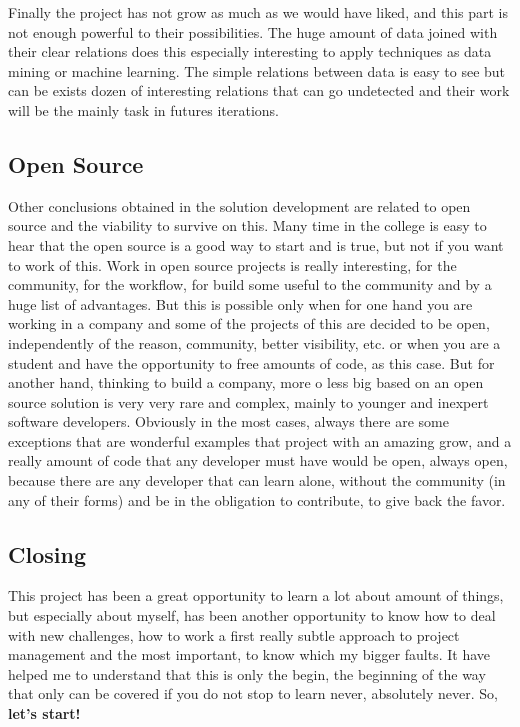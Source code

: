 Finally the project has not grow as much as we would have liked, and this part
is not enough powerful to their possibilities. The huge amount of data joined
with their clear relations does this especially interesting to apply techniques
as data mining or machine learning. The simple relations between data is easy
to see but can be exists dozen of interesting relations that can go undetected
and their work will be the mainly task in futures iterations.

\subsection{Open Source}

Other conclusions obtained in the solution development are related to open source and the
viability to survive on this. Many time in the college is easy to hear that the
open source is a good way to start and is true, but not if you want to work of
this. Work in open source projects is really interesting, for the community,
for the workflow, for build some useful to the community and by a huge list of
advantages. But this is possible only when for one hand you are working in a
company and some of the projects of this are decided to be open, independently of the
reason, community, better visibility, etc. or when you are a student and have
the opportunity to free amounts of code, as this case. But for another hand,
thinking to build a company, more o less big based on an open source solution
is very very rare and complex, mainly to younger and inexpert software developers.
\intro
Obviously in the most cases, always there are some exceptions that are
wonderful examples that project with an amazing grow, and a really amount of
code that any developer must have would be open, always open, because there
are any developer that can learn alone, without the community (in any of their
forms) and be in the obligation to contribute, to give back the favor.

\subsection{Closing}
This project has been a great opportunity to learn a lot about amount of things,
but especially about myself, has been another opportunity to know how to deal with
new challenges, how to work a first really subtle approach to project management and
the most important, to know which my bigger faults.
It have helped me to understand that this is only the begin, the beginning of
the way that only can be covered if you do not stop to learn never, absolutely never.
\intro
So, \textbf{let's start!}
